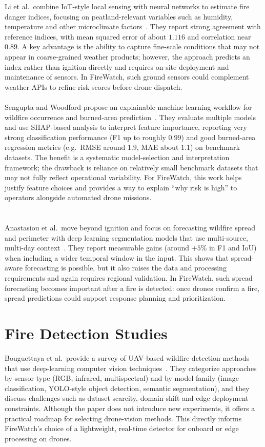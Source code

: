 Li et al.\ combine IoT-style local sensing with neural networks to estimate fire danger indices, focusing on peatland-relevant variables such as humidity, temperature and other microclimate factors~\cite{li2023}. They report strong agreement with reference indices, with mean squared error of about $1.116$ and correlation near $0.89$. A key advantage is the ability to capture fine-scale conditions that may not appear in coarse-grained weather products; however, the approach predicts an index rather than ignition directly and requires on-site deployment and maintenance of sensors. In FireWatch, such ground sensors could complement weather APIs to refine risk scores before drone dispatch.
\\ \\
Sengupta and Woodford propose an explainable machine learning workflow for wildfire occurrence and burned-area prediction~\cite{sengupta2025}. They evaluate multiple models and use SHAP-based analysis to interpret feature importance, reporting very strong classification performance (F1 up to roughly $0.99$) and good burned-area regression metrics (e.g.\ RMSE around $1.9$, MAE about $1.1$) on benchmark datasets. The benefit is a systematic model-selection and interpretation framework; the drawback is reliance on relatively small benchmark datasets that may not fully reflect operational variability. For FireWatch, this work helps justify feature choices and provides a way to explain ``why risk is high'' to operators alongside automated drone missions.
\\ \\ \\
Anastasiou et al.\ move beyond ignition and focus on forecasting wildfire spread and perimeter with deep learning segmentation models that use multi-source, multi-day context~\cite{anastasiou2025}. They report measurable gains (around $+5\%$ in F1 and IoU) when including a wider temporal window in the input. This shows that spread-aware forecasting is possible, but it also raises the data and processing requirements and again requires regional validation. In FireWatch, such spread forecasting becomes important after a fire is detected: once drones confirm a fire, spread predictions could support response planning and prioritization.
\\
\section{Fire Detection Studies}

Bouguettaya et al.\ provide a survey of UAV-based wildfire detection methods that use deep-learning computer vision techniques~\cite{bouguettaya2022}. They categorize approaches by sensor type (RGB, infrared, multispectral) and by model family (image classification, YOLO-style object detection, semantic segmentation), and they discuss challenges such as dataset scarcity, domain shift and edge deployment constraints. Although the paper does not introduce new experiments, it offers a practical roadmap for selecting drone-vision methods. This directly informs FireWatch's choice of a lightweight, real-time detector for onboard or edge processing on drones.

